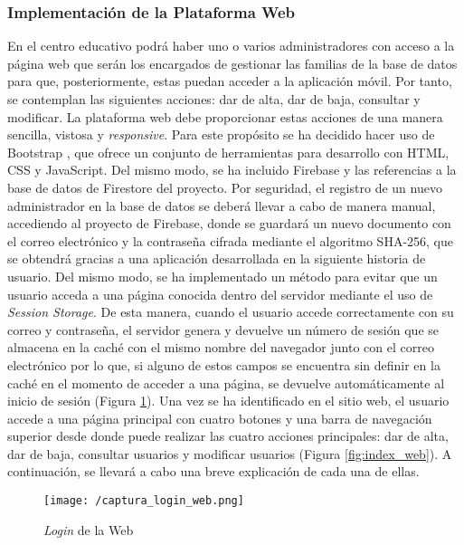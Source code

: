 \subsubsection{Implementación de la Plataforma Web}
En el centro educativo podrá haber uno o varios administradores con acceso a la página web que serán los encargados de gestionar las familias de la base de datos para que, posteriormente, estas puedan acceder a la aplicación móvil. Por tanto, se contemplan las siguientes acciones: dar de alta, dar de baja, consultar y modificar. La plataforma web debe proporcionar estas acciones de una manera sencilla, vistosa y \textit{responsive}. Para este propósito se ha decidido hacer uso de Bootstrap \cite{Bootstrap}, que ofrece un conjunto de herramientas para desarrollo con \acs{HTML}, \acs{CSS} y JavaScript. Del mismo modo, se ha incluido Firebase y las referencias a la base de datos de Firestore del proyecto. Por seguridad, el registro de un nuevo administrador en la base de datos se deberá llevar a cabo de manera manual, accediendo al proyecto de Firebase, donde se guardará un nuevo documento con el correo electrónico y la contraseña cifrada mediante el algoritmo SHA-256, que se obtendrá gracias a una aplicación desarrollada en la siguiente historia de usuario. Del mismo modo, se ha implementado un método para evitar que un usuario acceda a una página conocida dentro del servidor mediante el uso de \textit{Session Storage}. De esta manera, cuando el usuario accede correctamente con su correo y contraseña, el servidor genera y devuelve un número de sesión que se almacena en la caché con el mismo nombre del navegador junto con el correo electrónico por lo que, si alguno de estos campos se encuentra sin definir en la caché en el momento de acceder a una página, se devuelve automáticamente al inicio de sesión (Figura \ref{fig:login_web}). Una vez se ha identificado en el sitio web, el usuario accede a una página principal con cuatro botones y una barra de navegación superior desde donde puede realizar las cuatro acciones principales: dar de alta, dar de baja, consultar usuarios y modificar usuarios (Figura \ref{fig:index_web}). A continuación, se llevará a cabo una breve explicación de cada una de ellas.

\begin{figure}[!h]
	\begin{center}
		\texttt{[image: /captura\_login\_web.png]}
		\caption{\textit{Login} de la Web}
		\label{fig:login_web}
	\end{center}
\end{figure}

